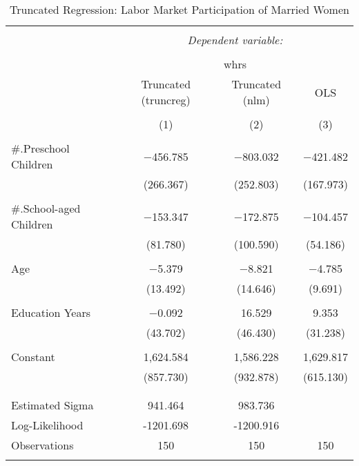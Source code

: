 \documentclass[
  12pt,
]{article}
\begin{document}
\begin{table}[t] \centering 
  \caption{Truncated Regression: Labor Market Participation of Married Women} 
  \label{lfp} 
\begin{tabular}{@{\extracolsep{5pt}}lccc} 
\\[-1.8ex]\hline 
\hline \\[-1.8ex] 
 & \multicolumn{3}{c}{\textit{Dependent variable:}} \\ 
\cline{2-4} 
\\[-1.8ex] & \multicolumn{3}{c}{whrs} \\ 
 & Truncated (truncreg) & Truncated (nlm) & OLS \\ 
\\[-1.8ex] & (1) & (2) & (3)\\ 
\hline \\[-1.8ex] 
 \#.Preschool Children & $-$456.785 & $-$803.032 & $-$421.482 \\ 
  & (266.367) & (252.803) & (167.973) \\ 
  & & & \\ 
 \#.School-aged Children & $-$153.347 & $-$172.875 & $-$104.457 \\ 
  & (81.780) & (100.590) & (54.186) \\ 
  & & & \\ 
 Age & $-$5.379 & $-$8.821 & $-$4.785 \\ 
  & (13.492) & (14.646) & (9.691) \\ 
  & & & \\ 
 Education Years & $-$0.092 & 16.529 & 9.353 \\ 
  & (43.702) & (46.430) & (31.238) \\ 
  & & & \\ 
 Constant & 1,624.584 & 1,586.228 & 1,629.817 \\ 
  & (857.730) & (932.878) & (615.130) \\ 
  & & & \\ 
\hline \\[-1.8ex] 
Estimated Sigma & 941.464 & 983.736 &  \\ 
Log-Likelihood & -1201.698 & -1200.916 &  \\ 
Observations & 150 & 150 & 150 \\ 
\hline 
\hline \\[-1.8ex] 
\end{tabular} 
\end{table}
\end{document}

